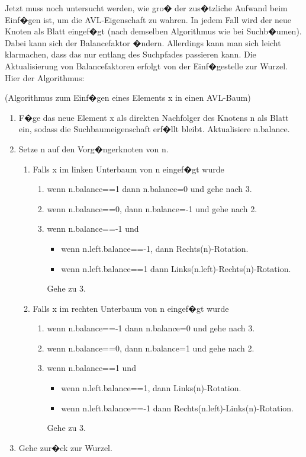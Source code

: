 \medskip
Jetzt muss noch untersucht werden, wie gro� der zus�tzliche Aufwand beim Einf�gen ist, um die AVL-Eigenschaft zu wahren. In jedem Fall wird der neue Knoten als Blatt eingef�gt (nach demselben Algorithmus wie bei Suchb�umen). Dabei kann sich der Balancefaktor �ndern. Allerdings kann man sich leicht klarmachen, dass das nur entlang des Suchpfades passieren kann. Die Aktualisierung von Balancefaktoren erfolgt von der Einf�gestelle zur Wurzel. Hier der Algorithmus:

\newpage
\begin{alg} \label{avlinsert}
	(Algorithmus zum Einf�gen eines Elements x in einen AVL-Baum)
	\begin{enumerate}
		\item F�ge das neue Element x als direkten Nachfolger des Knotens n als Blatt ein, sodass die Suchbaumeigenschaft erf�llt bleibt. Aktualisiere n.balance.
		\item Setze n auf den Vorg�ngerknoten von n.
			\begin{enumerate}
				\item Falls x im linken Unterbaum von n eingef�gt wurde
					\begin{enumerate}
						\item wenn n.balance==1 dann n.balance=0 und gehe nach 3.
						\item wenn n.balance==0, dann n.balance=-1 und gehe nach 2.
						\item wenn n.balance==-1 und 
							\begin{itemize}
								\item wenn n.left.balance==-1, dann Rechts(n)-Rotation.
								\item wenn n.left.balance==1 dann Links(n.left)-Rechts(n)-Rotation.
							\end{itemize}
							Gehe zu 3.
					\end{enumerate}
				\item Falls x im rechten Unterbaum von n eingef�gt wurde
					\begin{enumerate}
						\item wenn n.balance==-1 dann n.balance=0 und gehe nach 3.
						\item wenn n.balance==0, dann n.balance=1 und gehe nach 2.
						\item wenn n.balance==1 und
							\begin{itemize}
								\item wenn n.left.balance==1, dann Links(n)-Rotation.
								\item wenn n.left.balance==-1 dann Rechts(n.left)-Links(n)-Rotation.
							\end{itemize}
							Gehe zu 3.
					\end{enumerate}
			\end{enumerate}
		\item Gehe zur�ck zur Wurzel.
	\end{enumerate}
\end{alg}

